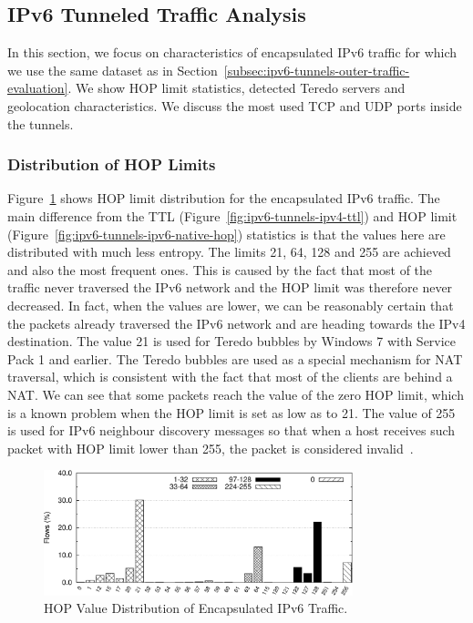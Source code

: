 \subsection{IPv6 Tunneled Traffic Analysis} \label{subsec:ipv6-tunnels-inner-traffic-evaluation}

In this section, we focus on characteristics of encapsulated IPv6 traffic for which we use the same dataset as in Section~\ref{subsec:ipv6-tunnels-outer-traffic-evaluation}. We show HOP limit statistics, detected Teredo servers and geolocation characteristics. We discuss the most used TCP and UDP ports inside the tunnels.

\subsubsection{Distribution of HOP Limits}
Figure~\ref{fig:ipv6-tunnels-tunnels-hop} shows HOP limit distribution for the encapsulated IPv6 traffic. The main difference from the TTL (Figure~\ref{fig:ipv6-tunnels-ipv4-ttl}) and HOP limit (Figure~\ref{fig:ipv6-tunnels-ipv6-native-hop}) statistics is that the values here are distributed with much less entropy. The limits 21, 64, 128 and 255 are achieved and also the most frequent ones. This is caused by the fact that most of the traffic never traversed the IPv6 network and the HOP limit was therefore never decreased. In fact, when the values are lower, we can be reasonably certain that the packets already traversed the IPv6 network and are heading towards the IPv4 destination. The value 21 is used for Teredo bubbles by Windows 7 with Service Pack 1 and earlier. The Teredo bubbles are used as a special mechanism for NAT traversal, which is consistent with the fact that most of the clients are behind a NAT. We can see that some packets reach the value of the zero HOP limit, which is a known problem when the HOP limit is set as low as to 21. The value of 255 is used for IPv6 neighbour discovery messages so that when a host receives such packet with HOP limit lower than 255, the packet is considered invalid~\cite{rfc4861}.

\begin{figure}[!tb]
        \centering
        \includegraphics[width=0.8\textwidth]{figures/paper-tunnels/ttl/hop}
        \caption{HOP Value Distribution of Encapsulated IPv6 Traffic.}
        \label{fig:ipv6-tunnels-tunnels-hop}
\end{figure}

